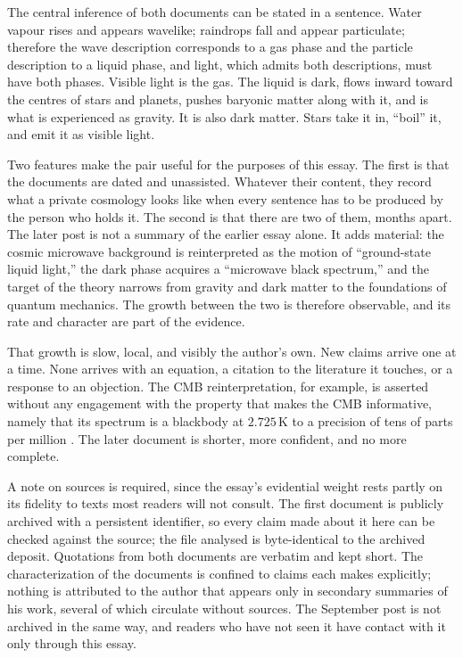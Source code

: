 \documentclass[11pt]{article}
\begin{document}
The central inference of both documents can be stated in a sentence. Water vapour rises and appears wavelike; raindrops fall and appear particulate; therefore the wave description corresponds to a gas phase and the particle description to a liquid phase, and light, which admits both descriptions, must have both phases. Visible light is the gas. The liquid is dark, flows inward toward the centres of stars and planets, pushes baryonic matter along with it, and is what is experienced as gravity. It is also dark matter. Stars take it in, ``boil'' it, and emit it as visible light.

Two features make the pair useful for the purposes of this essay. The first is that the documents are dated and unassisted. Whatever their content, they record what a private cosmology looks like when every sentence has to be produced by the person who holds it. The second is that there are two of them, months apart. The later post is not a summary of the earlier essay alone. It adds material: the cosmic microwave background is reinterpreted as the motion of ``ground-state liquid light,'' the dark phase acquires a ``microwave black spectrum,'' and the target of the theory narrows from gravity and dark matter to the foundations of quantum mechanics. The growth between the two is therefore observable, and its rate and character are part of the evidence.

That growth is slow, local, and visibly the author's own. New claims arrive one at a time. None arrives with an equation, a citation to the literature it touches, or a response to an objection. The CMB reinterpretation, for example, is asserted without any engagement with the property that makes the CMB informative, namely that its spectrum is a blackbody at $2.725\,$K to a precision of tens of parts per million \cite{fixsen1996}. The later document is shorter, more confident, and no more complete.

A note on sources is required, since the essay's evidential weight rests partly on its fidelity to texts most readers will not consult. The first document is publicly archived with a persistent identifier, so every claim made about it here can be checked against the source; the file analysed is byte-identical to the archived deposit. Quotations from both documents are verbatim and kept short. The characterization of the documents is confined to claims each makes explicitly; nothing is attributed to the author that appears only in secondary summaries of his work, several of which circulate without sources. The September post is not archived in the same way, and readers who have not seen it have contact with it only through this essay.
\end{document}
